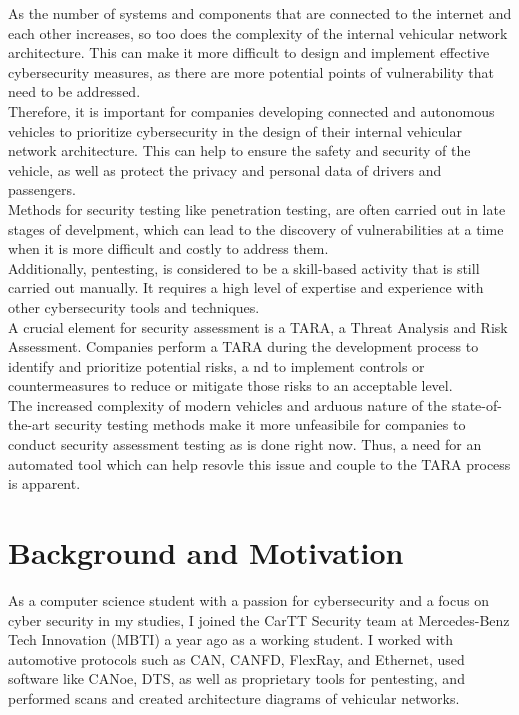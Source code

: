 As the number of systems and components that are connected to the internet and each other increases,
so too does the complexity of the internal vehicular network architecture. 
This can make it more difficult to design and implement effective cybersecurity measures, 
as there are more potential points of vulnerability that need to be addressed.\\
Therefore, it is important for companies developing connected and autonomous vehicles 
to prioritize cybersecurity in the design of their internal vehicular network architecture. 
This can help to ensure the safety and security of the vehicle, 
as well as protect the privacy and personal data of drivers and passengers.\\

Methods for security testing like penetration testing, are often carried out in late stages of develpment,
which can lead to the discovery of vulnerabilities at a time when it is more difficult and costly to address them.\\
Additionally, pentesting, is considered to be a skill-based activity that is still carried out manually.
It requires a high level of expertise and experience with other cybersecurity tools and techniques.\\
A crucial element for security assessment is a TARA, a Threat Analysis and Risk Assessment.
Companies perform a TARA during the development process to identify and prioritize potential risks, a
nd to implement controls or countermeasures to reduce or mitigate those risks to an acceptable level.\\

The increased complexity of modern vehicles and arduous nature of the state-of-the-art security testing methods
make it more unfeasibile for companies to conduct security assessment testing as is done right now.
Thus, a need for an automated tool which can help resovle this issue and couple to the TARA process is apparent.


\section{Background and Motivation}
\label{sec:background}

As a computer science student with a passion for cybersecurity and a focus on cyber security in my studies, 
I joined the CarTT Security team at Mercedes-Benz Tech Innovation (MBTI) a year ago as a working student.
I worked with automotive protocols such as CAN, CANFD, FlexRay, and Ethernet,
used software like CANoe, DTS, as well as proprietary tools for pentesting,
and performed scans and created architecture diagrams of vehicular networks.\\

